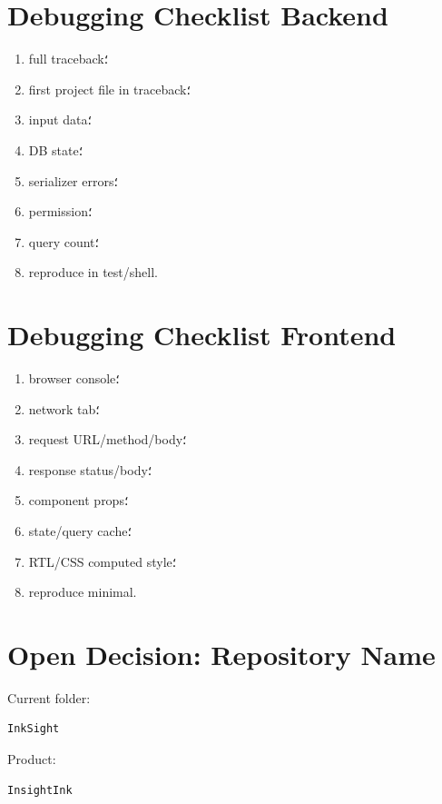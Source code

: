 \section{Debugging Checklist Backend}

\begin{enumerate}
  \item full traceback؛
  \item first project file in traceback؛
  \item input data؛
  \item DB state؛
  \item serializer errors؛
  \item permission؛
  \item query count؛
  \item reproduce in test/shell.
\end{enumerate}

\section{Debugging Checklist Frontend}

\begin{enumerate}
  \item browser console؛
  \item network tab؛
  \item request URL/method/body؛
  \item response status/body؛
  \item component props؛
  \item state/query cache؛
  \item RTL/CSS computed style؛
  \item reproduce minimal.
\end{enumerate}

\section{Open Decision: Repository Name}

Current folder:
\begin{latin}
\begin{lstlisting}
InkSight
\end{lstlisting}
\end{latin}

Product:
\begin{latin}
\begin{lstlisting}
InsightInk
\end{lstlisting}
\end{latin}

